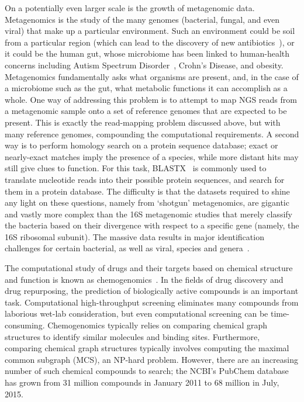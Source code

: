 \documentclass{acm_proc_article-sp}
\begin{document}
On a potentially even larger scale is the growth of metagenomic data.
Metagenomics is the study of the many genomes (bacterial, fungal, and even 
viral) that make up a particular environment.
Such an environment could be soil from a particular region (which can lead to 
the discovery of new 
antibiotics~\cite{forsberg2012shared}), or it could be 
the human gut, whose microbiome has been linked to human-health concerns 
including Autism Spectrum Disorder~\cite{macfabe2012short}, 
Crohn's Disease, and 
obesity.
Metagenomics fundamentally asks what organisms are present, and, in the case
of a microbiome such as the gut, what metabolic functions it can accomplish as
a whole.
One way of addressing this problem is to attempt to map NGS reads from a metagenomic sample
onto a set of reference genomes that are expected to be present.
This is exactly the read-mapping problem discussed above, but with many 
reference genomes, compounding the computational requirements.
A second way is to perform homology search on a protein sequence database;
exact or nearly-exact matches imply the presence of a species, while more 
distant hits may still give clues to function.
For this task, BLASTX~\cite{altschul1990basic} is commonly
used to translate nucleotide reads into their possible protein sequences, and
search for them in a protein database.
The difficulty is that the datasets required to shine any light on these 
questions, namely from `shotgun' metagenomics, are gigantic and vastly more 
complex than the 16S metagenomic studies that merely classify the bacteria 
based on 
their divergence with respect to a specific gene (namely, the 16S ribosomal 
subunit).
The massive data results in major identification 
challenges for certain bacterial, as well as viral, species and 
genera~\cite{janda200716s}. 

The computational study of drugs and their targets based on chemical structure and function
is known as chemogenomics~\cite{bredel2004chemogenomics}.
In the fields of drug discovery and drug repurposing, the prediction 
of biologically active compounds is an important task. 
Computational high-throughput screening eliminates many compounds from 
laborious wet-lab consideration, but even computational screening can be 
time-consuming.
Chemogenomics typically relies on comparing chemical graph structures to identify
similar molecules and binding sites.
Furthermore, comparing chemical graph structures typically involves computing
the maximal common subgraph (MCS), an NP-hard problem.
However, there are an increasing number of such chemical compounds
to search; the NCBI's PubChem database has grown from 31 million compounds in
January 2011 to 68 million in July, 2015.
\end{document}
